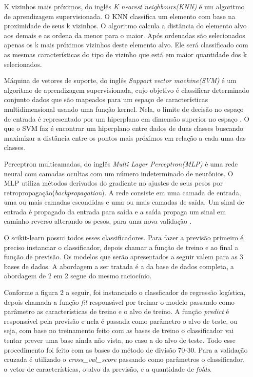 	K vizinhos mais próximos, do inglês \textit{K nearest neighbours(KNN)} é um algoritmo de aprendizagem supervisionada. O KNN classifica um elemento com base na proximidade de seus k vizinhos. O algoritmo calcula a distância do elemento alvo aos demais e as ordena da menor para o maior. Após ordenadas são selecionados apenas os k mais próximos vizinhos deste elemento alvo. Ele será classificado com as mesmas características do tipo de vizinho que está em maior quantidade dos k selecionados.
	
	Máquina de vetores de suporte, do inglês \textit{Support vector machine(SVM)} é um algoritmo de aprendizagem supervisionada, cujo objetivo é classificar determinado conjunto dados que são mapeados para um espaço de características multidimensional usando uma função kernel. Nela, o limite de decisão no espaço de entrada é representado por um hiperplano em dimensão superior no espaço \cite{Boser1992}. O que o SVM faz é encontrar um hiperplano entre dados de duas classes buscando maximizar a distância entre os pontos mais próximos em relação a cada uma das classes.
	
	Perceptron multicamadas, do inglês \textit{Multi Layer Perceptron(MLP)} é uma rede neural com camadas ocultas com um número indeterminado de neurônios. O MLP utiliza métodos derivados do gradiente no ajustes de seus pesos por retropropagação(\textit{backpropagation}). A rede consiste em uma camada de entrada, uma ou mais camadas escondidas e uma ou mais camadas de saída. Um sinal de entrada é propagado da entrada para saída e a saída propaga um sinal em caminho reverso alterando os pesos, para uma nova validação \cite{Amaral2014}.
	
	O scikit-learn possui todos esses classificadores. Para fazer a previsão primeiro é preciso instanciar o classificador, depois chamar a função de treino e ao final a função de previsão. Os modelos que serão apresentados a seguir valem para as 3 bases de dados. A abordagem a ser tratada é a da base de dados completa, a abordagem de 2 em 2 segue do mesmo raciocínio.
	
	Conforme a figura 2 a seguir, foi instanciado o classficador de regressão logística, depois chamada a função \textit{fit} responsável por treinar o modelo passando como parâmetro as características de treino e o alvo de treino. A função \textit{predict} é responsável pela previsão e nela é passada como parâmetro o alvo de teste, ou seja, com base no treinamento feito com as bases de treino o classificador vai tentar prever uma base ainda não vista, no caso a do alvo de teste.
	Todo esse procedimento foi feito com as bases do método de divisão 70-30. Para a validação cruzada é utilizado o \textit{cross\_val\_score} passando como parâmetros o classificador, o vetor de características, o alvo da previsão, e a quantidade de \textit{folds}.
	
